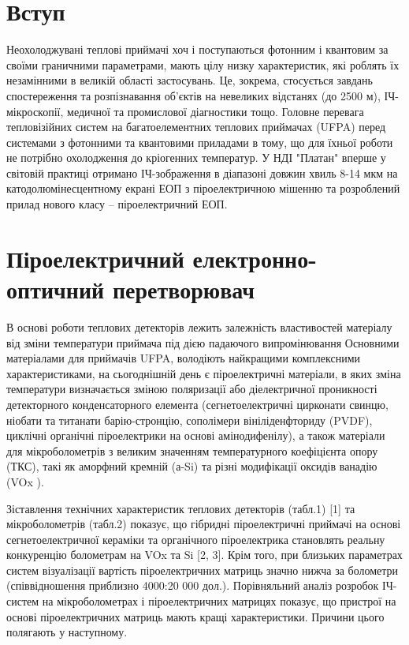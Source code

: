 \documentclass[a4paper,14pt]{extreport}
\begin{document}
\newpage

\chapter{Вступ}\par
  Неохолоджувані теплові приймачі хоч і поступаються
фотонним і квантовим за своїми граничними параметрами, мають цілу низку характеристик, які роблять їх незамінними в великій області
застосувань. Це, зокрема, стосується завдань
спостереження та розпізнавання об'єктів на невеликих
відстанях (до 2500 м), ІЧ-мікроскопії, медичної та промислової діагностики тощо. Головне
перевага тепловізійних систем на багатоелементних теплових приймачах (UFPA) перед системами з фотонними та квантовими приладами в тому, що
для їхньої роботи не потрібно охолодження до кріогенних температур. У НДІ "Платан" вперше у світовій
практиці отримано ІЧ-зображення в діапазоні довжин
хвиль 8-14 мкм на катодолюмінесцентному екрані
ЕОП з піроелектричною мішенню та розроблений
прилад нового класу – піроелектричний ЕОП.



\chapter{Піроелектричний електронно-оптичний перетворювач}\par
В основі роботи теплових детекторів лежить залежність властивостей
матеріалу від зміни температури приймача під дією падаючого випромінювання Основними матеріалами для приймачів UFPA,
володіють найкращими комплексними характеристиками, на сьогоднішній день є піроелектричні матеріали, в яких
зміна температури визначається зміною поляризації
або діелектричної проникності детекторного конденсаторного
елемента (сегнетоелектричні цирконати свинцю, ніобати та титанати барію-стронцію, сополімери вініліденфториду (PVDF), циклічні органічні піроелектрики на основі амінодифенілу), а
також матеріали для мікроболометрів з великим значенням температурного коефіцієнта опору (ТКС), такі як аморфний
кремній (а-Si) та різні модифікації оксидів ванадію (VOx
).\par
Зіставлення технічних характеристик теплових детекторів
(табл.1) [1] та мікроболометрів (табл.2) показує, що гібридні
піроелектричні приймачі на основі сегнетоелектричної кераміки та органічного піроелектрика становлять реальну конкуренцію болометрам на VOx та Si [2, 3].
Крім того, при близьких параметрах систем візуалізації вартість піроелектричних матриць значно нижча за болометри (співвідношення приблизно 4000:20 000 дол.).
Порівняльний аналіз розробок ІЧ-систем на мікроболометрах і піроелектричних матрицях показує, що пристрої на основі піроелектричних матриць мають кращі характеристики. Причини цього полягають у наступному.\\ 
\begin{figure}[h!]

\label{ris2}
\end{figure}
 
\end{document}

